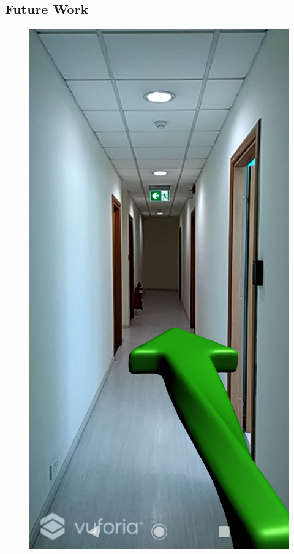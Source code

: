 \documentclass{aifyp}
\begin{document}
\begin{appendices}
\section{Future Work}
\begin{figure}[H]
    \centering
    \includegraphics[scale=0.2]{Images/Chapter7/futureImpl.png}
    \label{fig:HolographicArrowsInCorridor}
\end{figure}


\end{appendices}
\end{document}
